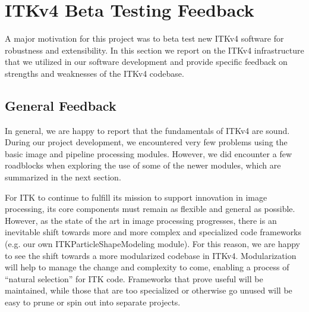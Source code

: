 \documentclass[11pt]{article}
\begin{document}

\section{ITKv4 Beta Testing Feedback}
A major motivation for this project was to beta test new ITKv4
software for robustness and extensibility.  In this section we report
on the ITKv4 infrastructure that we utilized in our software
development and provide specific feedback on strengths and weaknesses
of the ITKv4 codebase.

\subsection{General Feedback}
In general, we are happy to report that the fundamentals of ITKv4 are
sound.  During our project development, we encountered very few
problems using the basic image and pipeline processing modules.
However, we did encounter a few roadblocks when exploring the use of
some of the newer modules, which are summarized in the next section.

For ITK to continue to fulfill its mission to support innovation in
image processing, its core components must remain as flexible and
general as possible.  However, as the state of the art in image
processing progresses, there is an inevitable shift towards more and
more complex and specialized code frameworks (e.g. our own
ITKParticleShapeModeling module).  For this reason, we are happy to
see the shift towards a more modularized codebase in ITKv4.
Modularization will help to manage the change and complexity to come,
enabling a process of ``natural selection'' for ITK code.  Frameworks
that prove useful will be maintained, while those that are too
specialized or otherwise go unused will be easy to prune or spin out
into separate projects.
\end{document}
